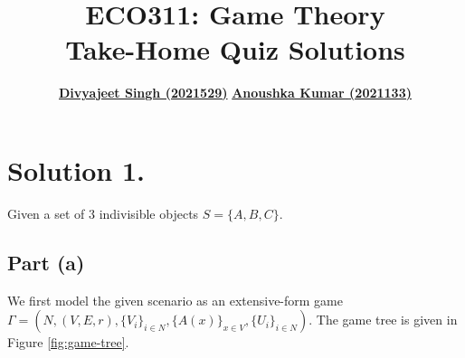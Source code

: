\documentclass[9pt]{article}
\title{
    \textbf{ECO311: Game Theory} \\
    \textbf{\large{Take-Home Quiz Solutions}}
}
\author{
    \href{mailto:divyajeet21529@iiitd.ac.in}{\textbf{Divyajeet Singh (2021529)}}
    \hspace*{30pt}
    \href{mailto:anoushka21133@iiitd.ac.in}{\textbf{Anoushka Kumar (2021133)}}
}
\date{}
\begin{document}
\maketitle

\section*{Solution 1.}
Given a set of 3 indivisible objects $S = \{ A, B, C \}$.

\subsection*{Part (a)}
We first model the given scenario as an extensive-form game $\Gamma = ( N, (V, E, r), \{ V_{i} \}_{i \in N}, \{ A(x) \}_{x \in V}, \{ U_{i} \}_{i \in N} )$.
The game tree is given in Figure \ref{fig:game-tree}.
\end{document}

